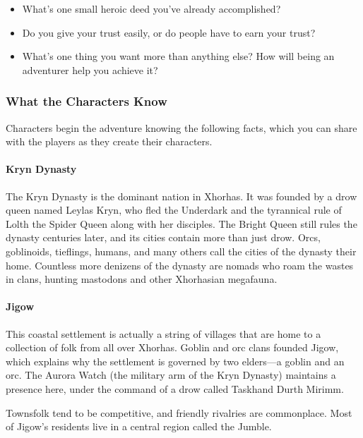 \documentclass[10pt,a4paper,twoside,bg=print,twocolumn,openany,nodeprecatedcode]{dndbook}
\begin{document}
\begin{itemize}
\item What's one small heroic deed you've already accomplished?
\item Do you give your trust easily, or do people have to earn your trust?
\item What's one thing you want more than anything else? How will being an adventurer help you achieve it?
\end{itemize}

\subsubsection{What the Characters Know}
Characters begin the adventure knowing the following facts, which you can share with the players as they create their characters.

\paragraph{Kryn Dynasty}
The Kryn Dynasty is the dominant nation in Xhorhas. It was founded by a drow queen named Leylas Kryn, who fled the Underdark and the tyrannical rule of Lolth the Spider Queen along with her disciples. The Bright Queen still rules the dynasty centuries later, and its cities contain more than just drow. Orcs, goblinoids, tieflings, humans, and many others call the cities of the dynasty their home. Countless more denizens of the dynasty are nomads who roam the wastes in clans, hunting mastodons and other Xhorhasian megafauna.

\paragraph{Jigow}
This coastal settlement is actually a string of villages that are home to a collection of folk from all over Xhorhas. Goblin and orc clans founded Jigow, which explains why the settlement is governed by two elders—a goblin and an orc. The Aurora Watch (the military arm of the Kryn Dynasty) maintains a presence here, under the command of a drow called Taskhand Durth Mirimm.

Townsfolk tend to be competitive, and friendly rivalries are commonplace. Most of Jigow's residents live in a central region called the Jumble.
\end{document}
